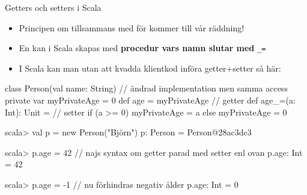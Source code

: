 \begin{Slide}{Getters och setters i Scala}\SlideFontSmall
\setlength{\leftmargini}{0pt}
\begin{itemize}
\item Principen om  tillsammans med  för  kommer till vår räddning!

\item
En  kan i Scala skapas med \textbf{procedur vars namn slutar med} \texttt{\_=}
\pause
\item I Scala kan man utan att kvadda klientkod införa getter+setter så här:
\end{itemize}
\begin{Code}
class Person(val name: String) { // ändrad implementation men samma access
  private var myPrivateAge = 0
  def age = myPrivateAge         // getter
  def age_=(a: Int): Unit =      // setter
    if (a >= 0) myPrivateAge = a else myPrivateAge = 0
}
\end{Code}
\pause\vspace{-0.5em}
\begin{REPL}
scala> val p = new Person("Björn")
p: Person = Person@28ac3dc3

scala> p.age = 42      // najs syntax om getter parad med setter enl ovan
p.age: Int = 42

scala> p.age = -1      // nu förhindras negativ ålder
p.age: Int = 0
\end{REPL}
\end{Slide}


